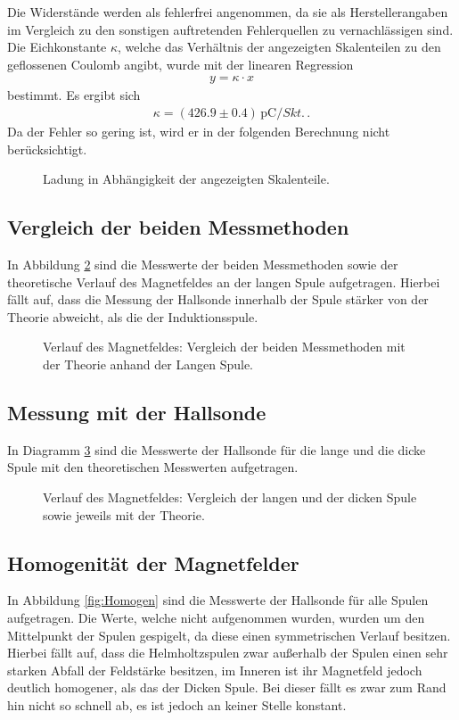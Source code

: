 \documentclass[12pt,a4paper,titlepage,headinclude,bibtotoc]{scrartcl}
\begin{document}
Die Widerstände werden als fehlerfrei angenommen, da sie als Herstellerangaben im Vergleich zu den sonstigen auftretenden Fehlerquellen zu vernachlässigen sind.
Die Eichkonstante $\kappa$, welche das Verhältnis der angezeigten Skalenteilen zu den geflossenen Coulomb angibt, wurde mit der linearen Regression
\begin{align*}
	y=\kappa\cdot x
\end{align*}
bestimmt.
Es ergibt sich
\begin{align}
	\kappa=(426.9 \pm 0.4)\,\si{\pico\coulomb\per Skt.}\,.
\end{align}
Da der Fehler so gering ist, wird er in der folgenden Berechnung nicht berücksichtigt.
\begin{figure}[!htb]
	\centering
	
	\caption{Ladung in Abhängigkeit der angezeigten Skalenteile.}
	\label{fig:Eichen}
\end{figure}

\subsection{Vergleich der beiden Messmethoden}
In Abbildung \ref{fig:LangIndHall} sind die Messwerte der beiden Messmethoden sowie der theoretische Verlauf des Magnetfeldes an der langen Spule aufgetragen.
Hierbei fällt auf, dass die Messung der Hallsonde innerhalb der Spule stärker von der Theorie abweicht, als die der Induktionsspule.
\begin{figure}[!htb]
	\centering
	
	\caption{Verlauf des Magnetfeldes: Vergleich der beiden Messmethoden mit der Theorie anhand der Langen Spule.}
	\label{fig:LangIndHall}
\end{figure}
\subsection{Messung mit der Hallsonde}
In Diagramm \ref{fig:HallVergleich} sind die Messwerte der Hallsonde für die lange und die dicke Spule mit den theoretischen Messwerten aufgetragen.

\begin{figure}[!htb]
	\centering
	
	\caption{Verlauf des Magnetfeldes: Vergleich der langen und der dicken Spule sowie jeweils mit der Theorie.}
	\label{fig:HallVergleich}
\end{figure}
\subsection{Homogenität der Magnetfelder}
In Abbildung \ref{fig:Homogen} sind die Messwerte der Hallsonde für alle Spulen aufgetragen.
Die Werte, welche nicht aufgenommen wurden, wurden um den Mittelpunkt der Spulen gespigelt, da diese einen symmetrischen Verlauf besitzen.
Hierbei fällt auf, dass die Helmholtzspulen zwar außerhalb der Spulen einen sehr starken Abfall der Feldstärke besitzen, im Inneren ist ihr Magnetfeld jedoch deutlich homogener, als das der Dicken Spule.
Bei dieser fällt es zwar zum Rand hin nicht so schnell ab, es ist jedoch an keiner Stelle konstant.
\end{document}

